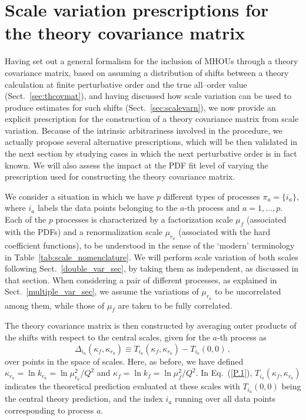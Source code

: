 \section{Scale variation prescriptions for the theory covariance matrix}
\label{sec:prescriptions}

Having set out a general formalism for the inclusion of MHOUs
through a theory covariance matrix, based on assuming a
distribution of shifts between a  theory calculation at finite
perturbative order and the true all--order value (Sect.~\ref{sec:thcovmat}), and having discussed
how scale variation can be used to produce estimates for such shifts (Sect.~\ref{sec:scalevarn}), we
now provide an explicit prescription for the construction of a theory covariance
matrix from scale variation.
%
Because of the intrinsic arbitrariness involved in
the procedure, we actually propose several alternative prescriptions,
which will be then validated in the next section
by studying cases in which the next
perturbative order is in fact known.
%
We will also assess the impact at the PDF fit level of varying the prescription
used for constructing the theory covariance matrix.

We consider a situation in which we have $p$ different types of
processes $\pi_a =\{i_a\}$, where $i_a$ labels the data points
belonging to the $a$-th process and $a = 1,\ldots,p$.
%
Each of the $p$ processes is characterized  by a factorization scale
$\mu_f$ (associated with the PDFs) and a renormalization 
scale $\mu_{r_a}$ (associated with the hard coefficient functions), to be
understood in the sense of the `modern'
terminology in
Table~\ref{tab:scale_nomenclature}.
%
We will perform scale variation of both scales
following Sect.~\ref{double_var_sec}, by taking them as independent, as
discussed in that section.
%
When considering a pair of different processes, as
explained in Sect.~\ref{multiple_var_sec}, we assume the variations of
$\mu_{r_a}$ to be uncorrelated among them, while those of $\mu_f$ are taken to be fully
correlated.

The theory covariance matrix is then constructed by averaging outer products of the shifts
with respect to the central scales, given for the $a$-th process as
\begin{equation} \label{P.1}
  \Delta_{i_a} (\kappa_f, \kappa_{r_a} ) \equiv
  T_{i_a}(\kappa_f, \kappa_{r_a}) - T_{i_a}(0,0) \, ,
\end{equation}
over points in the space of scales.
%
Here, as before, we have defined 
$\kappa_{r_a}=\ln k_{r_a} = \ln \mu_{r_a}^2/Q^2$
and
$\kappa_{f}=\ln k_{f} = \ln \mu_{f}^2/Q^2$.
%
In Eq.~(\ref{P.1}),
$T_{i_a}(\kappa_f, \kappa_{r_a})$ indicates
the theoretical prediction evaluated at these scales with
$T_{i_a}(0,0)$ being the central theory prediction, and the index
$i_a$ running over all data points corresponding to process $a$.

